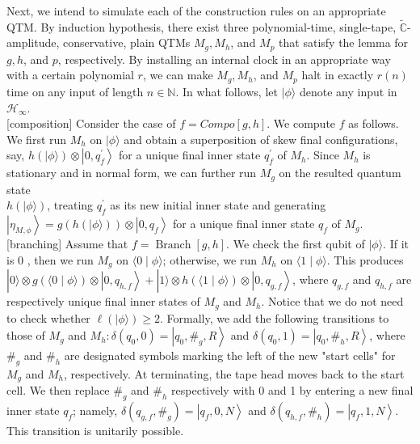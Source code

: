 \documentclass[10pt]{article}
\begin{document}
Next, we intend to simulate each of the construction rules on an appropriate QTM. By induction hypothesis, there exist three polynomial-time, single-tape, $\tilde{\mathbb{C}}$-amplitude, conservative, plain QTMs $M_{g}, M_{h}$, and $M_{p}$ that satisfy the lemma for $g, h$, and $p$, respectively. By installing an internal clock in an appropriate way with a certain polynomial $r$, we can make $M_{g}, M_{h}$, and $M_{p}$ halt in exactly $r(n)$ time on any input of length $n \in \mathbb{N}$. In what follows, let $|\phi\rangle$ denote any input in $\mathcal{H}_{\infty}$.\\[0pt]
[composition] Consider the case of $f=C o m p o[g, h]$. We compute $f$ as follows. We first run $M_{h}$ on $|\phi\rangle$ and obtain a superposition of skew final configurations, say, $h(|\phi\rangle) \otimes\left|0, q_{f}^{\prime}\right\rangle$ for a unique final inner state $q_{f}^{\prime}$ of $M_{h}$. Since $M_{h}$ is stationary and in normal form, we can further run $M_{g}$ on the resulted quantum state\\
$h(|\phi\rangle)$, treating $q_{f}^{\prime}$ as its new initial inner state and generating $\left|\eta_{M, \phi}\right\rangle=g(h(|\phi\rangle)) \otimes\left|0, q_{f}\right\rangle$ for a unique final inner state $q_{f}$ of $M_{g}$.\\[0pt]
[branching] Assume that $f=\operatorname{Branch}[g, h]$. We check the first qubit of $|\phi\rangle$. If it is 0 , then we run $M_{g}$ on $\langle 0 \mid \phi\rangle$; otherwise, we run $M_{h}$ on $\langle 1 \mid \phi\rangle$. This produces $|0\rangle \otimes g(\langle 0 \mid \phi\rangle) \otimes\left|0, q_{h, f}\right\rangle+|1\rangle \otimes h(\langle 1 \mid \phi\rangle) \otimes\left|0, q_{g, f}\right\rangle$, where $q_{g, f}$ and $q_{h, f}$ are respectively unique final inner states of $M_{g}$ and $M_{h}$. Notice that we do not need to check whether $\ell(|\phi\rangle) \geq 2$. Formally, we add the following transitions to those of $M_{g}$ and $M_{h}: \delta\left(q_{0}, 0\right)=\left|q_{0}, \#_{g}, R\right\rangle$ and $\delta\left(q_{0}, 1\right)=\left|q_{0}, \#_{h}, R\right\rangle$, where $\#_{g}$ and $\#_{h}$ are designated symbols marking the left of the new "start cells" for $M_{g}$ and $M_{h}$, respectively. At terminating, the tape head moves back to the start cell. We then replace $\#_{g}$ and $\#_{h}$ respectively with 0 and 1 by entering a new final inner state $q_{f}$; namely, $\delta\left(q_{g, f}, \#_{g}\right)=\left|q_{f}, 0, N\right\rangle$ and $\delta\left(q_{h, f}, \#_{h}\right)=\left|q_{f}, 1, N\right\rangle$. This transition is unitarily possible.\\[0pt]
\end{document}
